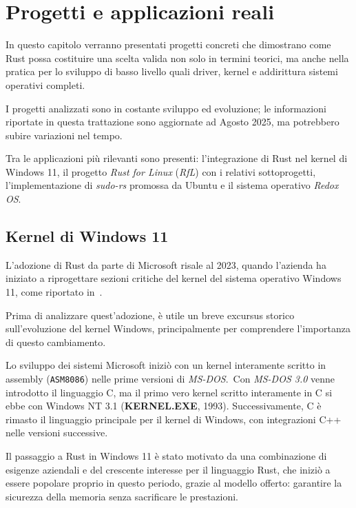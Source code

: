 
\chapter{Progetti e applicazioni reali}\label{cap:05}

In questo capitolo verranno presentati progetti concreti che dimostrano
come Rust possa costituire una scelta valida non solo in termini teorici, ma anche nella pratica per lo sviluppo 
di basso livello quali driver, kernel e addirittura sistemi operativi completi.

I progetti analizzati sono in costante sviluppo ed evoluzione;
le informazioni riportate in questa trattazione sono aggiornate ad Agosto 2025, ma potrebbero subire
variazioni nel tempo.

Tra le applicazioni più rilevanti sono presenti: l'integrazione di Rust nel kernel di Windows 11,
il progetto \textit{Rust for Linux} (\textit{RfL}) con i relativi sottoprogetti, l'implementazione 
di \textit{sudo-rs} promossa da Ubuntu e il sistema operativo \textit{Redox OS}.\ 

\section{Kernel di Windows 11}
L'adozione di Rust da parte di Microsoft risale al 2023, quando l'azienda ha iniziato a riprogettare sezioni critiche del
kernel del sistema operativo Windows 11, come riportato in~\cite{microsoft-rust}.

Prima di analizzare quest'adozione, è utile un breve excursus storico sull'evoluzione del kernel Windows, principalmente per comprendere l'importanza di questo cambiamento.
\begin{framed}
\noindent Lo sviluppo dei sistemi Microsoft iniziò con un kernel interamente scritto in assembly (\texttt{ASM8086}) nelle prime 
versioni di \textit{MS-DOS}.\ Con \textit{MS-DOS 3.0} venne introdotto il linguaggio C, ma il primo vero kernel scritto interamente in C
si ebbe con Windows NT 3.1 (\textbf{KERNEL.EXE}, 1993). Successivamente, C è rimasto il linguaggio principale per il kernel di Windows, con integrazioni C++ nelle
versioni successive.
\end{framed}
\noindent Il passaggio a Rust in Windows 11 è stato motivato da una combinazione di esigenze aziendali e del crescente interesse per il linguaggio Rust, che
iniziò a essere popolare proprio in questo periodo, grazie al modello offerto: garantire la sicurezza della memoria senza sacrificare le prestazioni.

